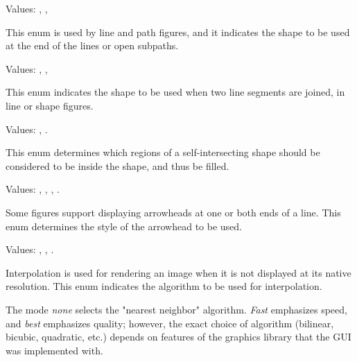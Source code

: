 
Values: , , 

This enum is used by line and path figures, and it indicates the shape to
be used at the end of the lines or open subpaths.

\begin{center}
\end{center}


Values: , , 

This enum indicates the shape to be used when two line segments are joined,
in line or shape figures.

\begin{center}
\end{center}


Values: , .

This enum determines which regions of a self-intersecting shape
should be considered to be inside the shape, and thus be filled.

\begin{center}
\end{center}


Values: , , , .

Some figures support displaying arrowheads at one or both ends of a line.
This enum determines the style of the arrowhead to be used.

\begin{center}
\end{center}


Values: , , .

Interpolation is used for rendering an image when it is not displayed at
its native resolution. This enum indicates the algorithm to be used for
interpolation.

The mode \textit{none} selects the "nearest neighbor" algorithm.
\textit{Fast} emphasizes speed, and \textit{best} emphasizes quality;
however, the exact choice of algorithm (bilinear, bicubic, quadratic, etc.)
depends on features of the graphics library that the GUI was implemented with.

